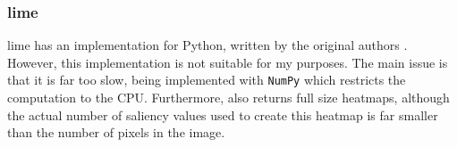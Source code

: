 \documentclass[UKenglish]{uiomasterthesis} %
\theoremstyle{definition}
\begin{document}
%
%
%
%
%
%
%
%
%
%
%
%
%
%


\subsubsection{\ac{lime}}

\ac{lime} has an implementation for Python, written by the original authors \cite{lime}. However, this implementation is not suitable for my purposes. The main issue is that it is far too slow, being implemented with \texttt{NumPy} which restricts the computation to the CPU. Furthermore, \cite{lime} also returns full size heatmaps, although the actual number of saliency values used to create this heatmap is far smaller than the number of pixels in the image.
\end{document}
